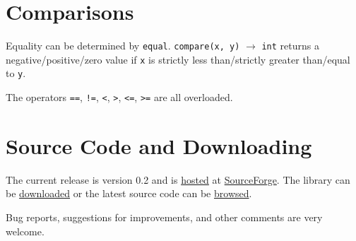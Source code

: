 \documentclass[a4paper]{article}
\begin{document}
\section{Comparisons}

Equality can be determined by \texttt{equal}. \texttt{compare(x, y)} $\rightarrow$ \texttt{int} returns a negative/positive/zero value if \texttt{x} is strictly less than/strictly greater than/equal to \texttt{y}.

The operators \texttt{==}, \texttt{!=}, \texttt{<}, \texttt{>}, \texttt{<=}, \texttt{>=} are all overloaded.


\section{Source Code and Downloading}

The current release is version 0.2 and is \href{http://sourceforge.net/projects/sputsoftnumbers/}{hosted} at \href{http://sourceforge.net}{SourceForge}. The library can be \href{https://sourceforge.net/projects/sputsoftnumbers/files/}{downloaded} or the latest source code can be \href{http://sputsoftnumbers.svn.sourceforge.net/viewvc/sputsoftnumbers/trunk/}{browsed}.

Bug reports, suggestions for improvements, and other comments are very welcome.
\end{document}
